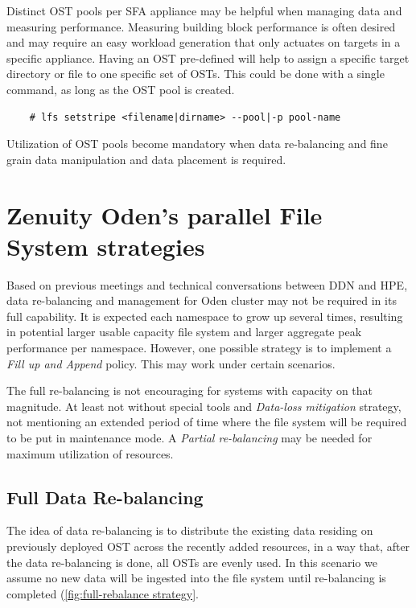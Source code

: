 \documentclass{article}
\begin{document}
Distinct OST pools per SFA appliance may be helpful when managing data and measuring performance. Measuring
building block performance is often desired and may require an easy workload generation that only actuates on targets in a specific appliance. Having an OST pre-defined will help to assign a specific target directory or file to one specific set of OSTs. This could be done with a single command, as long as the OST pool is created.

    \begin{verbatim}
    # lfs setstripe <filename|dirname> --pool|-p pool-name
    \end{verbatim}
Utilization of OST pools become mandatory when data re-balancing and fine grain data manipulation and  data placement is required. 

\section{Zenuity Oden's parallel File System strategies}
Based on previous meetings and technical conversations between DDN and HPE, data re-balancing and management for Oden cluster may not be required in its full capability. It is expected each namespace to grow up several times, resulting in potential larger usable capacity file system and larger aggregate peak performance per namespace. However, one possible strategy is to implement a \textit{Fill up and Append} policy. This may work under certain scenarios. 

The full re-balancing is not encouraging for systems with capacity on that magnitude. At least not without special tools and \textit{Data-loss mitigation} strategy, not mentioning an extended period of time where the file system will be required to be put in maintenance mode. A \textit{Partial re-balancing} may be needed for maximum utilization of resources.

\subsection{Full Data Re-balancing}
The idea of data re-balancing is to distribute the existing data residing on previously deployed OST across the recently added resources, in a way that, after the data re-balancing is done, all OSTs are evenly used. In this scenario we assume no new data will be ingested into the file system until re-balancing is completed (\ref{fig:full-rebalance strategy}. 
\end{document}
